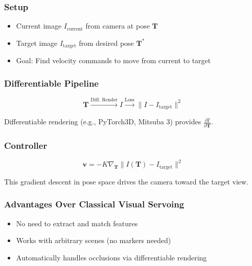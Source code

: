 \subsubsection{Setup}

\begin{itemize}
    \item Current image $I_{\text{current}}$ from camera at pose $\mathbf{T}$
    \item Target image $I_{\text{target}}$ from desired pose $\mathbf{T}^*$
    \item Goal: Find velocity commands to move from current to target
\end{itemize}

\subsubsection{Differentiable Pipeline}

\begin{equation}
\mathbf{T} \xrightarrow{\text{Diff. Render}} I \xrightarrow{\text{Loss}} \| I - I_{\text{target}} \|^2
\end{equation}

Differentiable rendering (e.g., PyTorch3D, Mitsuba 3) provides $\frac{\partial I}{\partial \mathbf{T}}$.

\subsubsection{Controller}

\begin{equation}
\mathbf{v} = -K \nabla_{\mathbf{T}} \| I(\mathbf{T}) - I_{\text{target}} \|^2
\end{equation}

This gradient descent in pose space drives the camera toward the target view.

\subsubsection{Advantages Over Classical Visual Servoing}

\begin{itemize}
    \item No need to extract and match features
    \item Works with arbitrary scenes (no markers needed)
    \item Automatically handles occlusions via differentiable rendering
\end{itemize}

